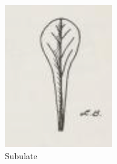 \documentclass[12pt,english]{article}
\begin{document}
\begin{figure}[!hbt]
\begin{centre}
\begin{minipage}{0.19\textwidth}
		\includegraphics[width=\textwidth]{../code/contour/spathulate_with_signature}
	\end{minipage}
	\begin{minipage}{0.19\textwidth}
		\caption{Subulate}

\end{minipage}
\end{centre}
\end{figure}
\end{document}

